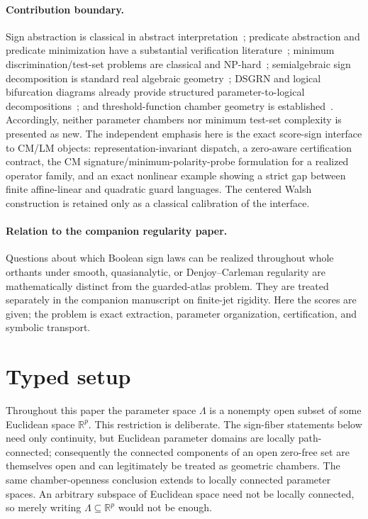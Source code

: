 \documentclass[11pt]{article}
\theoremstyle{definition}
\theoremstyle{remark}
\newcommand{\R}{\mathbb{R}}
\begin{document}
\paragraph{Contribution boundary.}
Sign abstraction is classical in abstract interpretation~\cite{CousotCousot1977}; predicate abstraction and predicate minimization have a substantial verification literature~\cite{ChakiEtAl2003}; minimum discrimination/test-set problems are classical and NP-hard~\cite{MoretShapiro1985,BermanDasGuptaKao2005}; semialgebraic sign decomposition is standard real algebraic geometry~\cite{BasuPollackRoy2006}; DSGRN and logical bifurcation diagrams already provide structured parameter-to-logical decompositions~\cite{CumminsEtAl2018,Gedeon2020,AbouJaoudeMonteiro2019}; and threshold-function chamber geometry is established~\cite{Anthony2026}. Accordingly, neither parameter chambers nor minimum test-set complexity is presented as new. The independent emphasis here is the exact score-sign interface to CM/LM objects: representation-invariant dispatch, a zero-aware certification contract, the CM signature/minimum-polarity-probe formulation for a realized operator family, and an exact nonlinear example showing a strict gap between finite affine-linear and quadratic guard languages. The centered Walsh construction is retained only as a classical calibration of the interface.

\paragraph{Relation to the companion regularity paper.}
Questions about which Boolean sign laws can be realized throughout whole orthants under smooth, quasianalytic, or Denjoy--Carleman regularity are mathematically distinct from the guarded-atlas problem. They are treated separately in the companion manuscript on finite-jet rigidity. Here the scores are given; the problem is exact extraction, parameter organization, certification, and symbolic transport.

\section{Typed setup}\label{sec:setup}

Throughout this paper the parameter space $\Lambda$ is a nonempty open subset of some Euclidean space $\R^p$. This restriction is deliberate. The sign-fiber statements below need only continuity, but Euclidean parameter domains are locally path-connected; consequently the connected components of an open zero-free set are themselves open and can legitimately be treated as geometric chambers. The same chamber-openness conclusion extends to locally connected parameter spaces. An arbitrary subspace of Euclidean space need not be locally connected, so merely writing $\Lambda\subseteq\R^p$ would not be enough.
\end{document}
